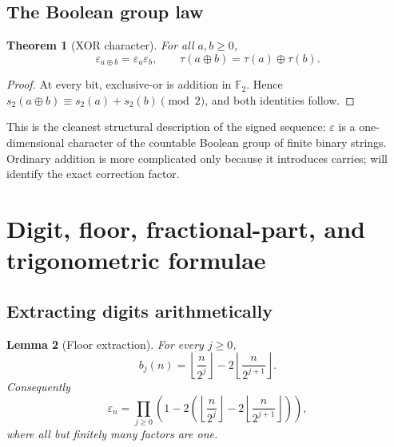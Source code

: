 \documentclass[11pt,oneside]{article}
\newtheorem{theorem}{Theorem}[section]
\newtheorem{lemma}[theorem]{Lemma}
\theoremstyle{definition}
\theoremstyle{remark}
\newcommand{\Ftwo}{\mathbb F_2}
\newcommand{\wt}{s_2}
\newcommand{\eps}{\varepsilon}
\newcommand{\xor}{\mathbin{\oplus}}
\begin{document}
\subsection{The Boolean group law}

\begin{theorem}[XOR character]
\label{thm:xor-character}
For all \(a,b\ge0\),
\begin{equation}
  \eps_{a\xor b}=\eps_a\eps_b,
  \qquad
  \tau(a\xor b)=\tau(a)\xor\tau(b).                         \label{eq:xor-character}
\end{equation}
\end{theorem}

\begin{proof}
At every bit, exclusive-or is addition in \(\Ftwo\).  Hence
\(\wt(a\xor b)\equiv\wt(a)+\wt(b)\pmod2\), and both identities follow.
\end{proof}

This is the cleanest structural description of the signed sequence: \(\eps\) is a
one-dimensional character of the countable Boolean group of finite binary strings.
Ordinary addition is more complicated only because it introduces carries; 
will identify the exact correction factor.

\section{Digit, floor, fractional-part, and trigonometric formulae}
\label{sec:digits}

\subsection{Extracting digits arithmetically}

\begin{lemma}[Floor extraction]
For every \(j\ge0\),
\begin{equation}
  b_j(n)=\left\lfloor\frac{n}{2^j}\right\rfloor
        -2\left\lfloor\frac{n}{2^{j+1}}\right\rfloor.       \label{eq:floor-bit}
\end{equation}
Consequently
\begin{equation}
  \eps_n=\prod_{j\ge0}\left(1-2\left(
    \left\lfloor\frac{n}{2^j}\right\rfloor
    -2\left\lfloor\frac{n}{2^{j+1}}\right\rfloor\right)\right),
  \label{eq:floor-digit-product}
\end{equation}
where all but finitely many factors are one.
\end{lemma}
\end{document}
